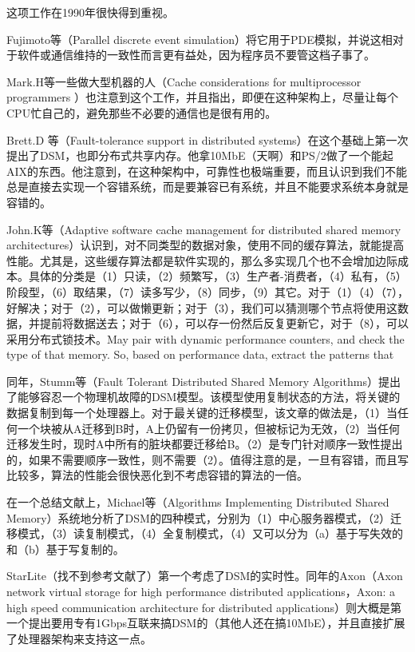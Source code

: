 \documentclass[a4paper,twoside]{scrbook}
\begin{document}
这项工作在1990年很快得到重视。

Fujimoto等（Parallel discrete event simulation）将它用于PDE模拟，并说这相对于软件或通信维持的一致性而言更有益处，因为程序员不要管这档子事了。

Mark.H等一些做大型机器的人（Cache considerations for multiprocessor programmers
）也注意到这个工作，并且指出，即便在这种架构上，尽量让每个CPU忙自己的，避免那些不必要的通信也是很有用的。

Brett.D 等（Fault-tolerance support in distributed systems）在这个基础上第一次提出了DSM，也即分布式共享内存。他拿10MbE（天啊）和PS/2做了一个能起AIX的东西。他注意到，在这种架构中，可靠性也极端重要，而且认识到我们不能总是直接去实现一个容错系统，而是要兼容已有系统，并且不能要求系统本身就是容错的。

John.K等（Adaptive software cache management for distributed shared memory architectures）认识到，对不同类型的数据对象，使用不同的缓存算法，就能提高性能。尤其是，这些缓存算法都是软件实现的，那么多实现几个也不会增加边际成本。具体的分类是（1）只读，（2）频繁写，（3）生产者-消费者，（4）私有，（5）阶段型，（6）取结果，（7）读多写少，（8）同步，（9）其它。对于（1）（4）（7），好解决；对于（2），可以做懒更新；对于（3），我们可以猜测哪个节点将使用这数据，并提前将数据送去；对于（6），可以存一份然后反复更新它，对于（8），可以采用分布式锁技术。May pair with dynamic performance counters, and check the type of that memory. So, based on performance data, extract the patterns that 

同年，Stumm等（Fault Tolerant Distributed Shared Memory Algorithms）提出了能够容忍一个物理机故障的DSM模型。该模型使用复制状态的方法，将关键的数据复制到每一个处理器上。对于最关键的迁移模型，该文章的做法是，（1）当任何一个块被从A迁移到B时，A上仍留有一份拷贝，但被标记为无效，（2）当任何迁移发生时，现时A中所有的脏块都要迁移给B。（2）是专门针对顺序一致性提出的，如果不需要顺序一致性，则不需要（2）。值得注意的是，一旦有容错，而且写比较多，算法的性能会很快恶化到不考虑容错的算法的一倍。

在一个总结文献上，Michael等（Algorithms Implementing Distributed Shared Memory）系统地分析了DSM的四种模式，分别为（1）中心服务器模式，（2）迁移模式，（3）读复制模式，（4）全复制模式，（4）又可以分为（a）基于写失效的和（b）基于写复制的。

StarLite（找不到参考文献了）第一个考虑了DSM的实时性。同年的Axon（Axon network virtual storage for high performance distributed applications，Axon: a high speed communication architecture for distributed applications）则大概是第一个提出要用专有1Gbps互联来搞DSM的（其他人还在搞10MbE），并且直接扩展了处理器架构来支持这一点。
\end{document}
